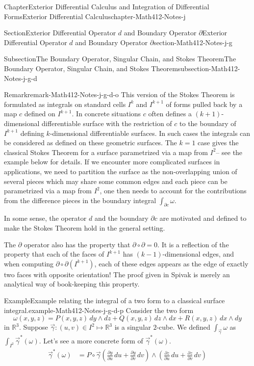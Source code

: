 \documentclass[oneside,10pt,]{book}
\numberwithin{equation}{section}
\newcommand{\bbR}{\mathbb{R}}
\newcommand{\vg}{{\vec{\gamma}}}
\newcommand{\amp}{&}
\begin{document}
\begin{chapterptx}{Chapter}{Exterior Differential Calculus and Integration of Differential Forms}{}{Exterior Differential Calculus}{}{}{chapter-Math412-Notes-j}
\begin{sectionptx}{Section}{Exterior Differential Operator \(d\) and Boundary Operator \(\partial\)}{}{Exterior Differential Operator \(d\) and Boundary Operator \(\partial\)}{}{}{section-Math412-Notes-j-g}
\begin{subsectionptx}{Subsection}{The Boundary Operator, Singular Chain, and Stokes Theorem}{}{The Boundary Operator, Singular Chain, and Stokes Theorem}{}{}{subsection-Math412-Notes-j-g-d}
\begin{remark}{Remark}{}{remark-Math412-Notes-j-g-d-o}
This version of the Stokes Theorem is formulated as  integrals on standard cells \(I^{k}\) and \(I^{k+1}\) of forms pulled back by a map \(c\) defined on \(I^{k+1}\). In concrete situations \(c\) often defines a \((k+1)\)-dimensional differentiable surface with the restriction of \(c\) to the boundary of \(I^{k+1}\) defining \(k\)-dimensional differentiable surfaces. In such cases the integrals can be considered as defined on these geometric surfaces. The \(k=1\) case gives the classical Stokes Theorem for a surface parametrized via  a map from \(I^{2}\mbox{--}\) see the example below for details. If we encounter more complicated surfaces in applications, we need to partition the surface as the non-overlapping union of several pieces which may share some common edges and each piece can be parametrized via  a map from \(I^{2}\), one then needs to account for the contributions from the difference pieces in the boundary integral \(\int_{\partial c}\omega\).%
\par
In some sense, the operator \(d\) and the boundary \(\partial c\) are motivated and defined to make the Stokes Theorem hold in the general setting.%
\par
The \(\partial\) operator also has the property that \(\partial \circ \partial =0\). It is a reflection of the property that each of the faces of \(I^{k+1}\) has \((k-1)\)-dimensional edges, and when computing \(\partial \circ \partial ( I^{k+1})\), each of these edges appears as the edge of exactly two faces with opposite orientation! The proof given in Spivak is merely an analytical way of book-keeping this property.%
\end{remark}
\begin{example}{Example}{Example relating the integral of a two form to a classical surface integral.}{example-Math412-Notes-j-g-d-p}%
Consider the two form%
\begin{equation*}
\omega(x, y, z) = P(x, y, z) \, dy\wedge dz + Q(x, y, z)\, dz\wedge dx + R(x, y, z) \, dx\wedge dy
\end{equation*}
in \(\bbR^{3}\). Suppose \(\vg: (u, v)\in I^{2} \mapsto \bbR^{3}\) is a singular \(2\)-cube. We defined \(\int_{\vg}\omega \) as \(\int_{I^{2}} \vg^{*}(\omega)\). Let's see a more concrete form of \(\vg^{*}(\omega)\).%
\begin{align*}
\vg^{*}(\omega) \amp= P\circ \vg \left(\frac{\partial y}{\partial u} \, du + \frac{\partial y}{\partial v} \, dv\right)
\wedge \left(\frac{\partial z}{\partial u} \, du + \frac{\partial z}{\partial v} \, dv\right) \\

\end{align*}
\end{example}
\end{subsectionptx}
\end{sectionptx}
\end{chapterptx}
\end{document}
